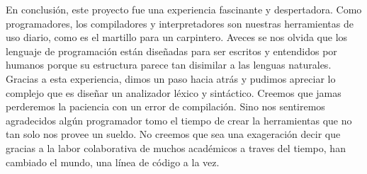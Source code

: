 En conclusión, este proyecto fue una experiencia fascinante y despertadora.
Como programadores, los compiladores y interpretadores son nuestras herramientas de uso diario, como es el martillo para un carpintero.
Aveces se nos olvida que los lenguaje de programación están diseñadas para ser escritos y entendidos por humanos porque su estructura parece tan disimilar a las lenguas naturales. 
Gracias a esta experiencia, dimos un paso hacia atrás y pudimos apreciar lo complejo que es diseñar un analizador léxico y sintáctico.
Creemos que jamas perderemos la paciencia con un error de compilación.
Sino nos sentiremos agradecidos algún programador tomo el tiempo de crear la herramientas que no tan solo nos provee un sueldo. 
No creemos que sea una exageración decir que gracias a la labor colaborativa de muchos académicos a traves del tiempo, han cambiado el mundo, una línea de código a la vez.